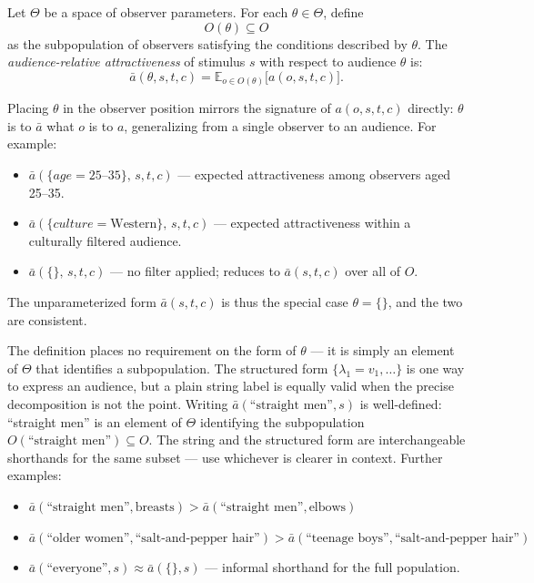 \begin{definition}
Let $\Theta$ be a space of observer parameters.
For each $\theta \in \Theta$, define
\[
  O(\theta) \subseteq O
\]
as the subpopulation of observers satisfying the conditions described by $\theta$.
The \emph{audience-relative attractiveness} of stimulus $s$ with respect to audience $\theta$ is:
\[
  \bar{a}(\theta, s, t, c) = \mathbb{E}_{o \in O(\theta)}\bigl[a(o, s, t, c)\bigr].
\]
\end{definition}

Placing $\theta$ in the observer position mirrors the signature of $a(o, s, t, c)$ directly: $\theta$ is to $\bar{a}$ what $o$ is to $a$, generalizing from a single observer to an audience.
For example:
\begin{itemize}
  \item $\bar{a}(\{\textit{age} = 25\text{--}35\},\, s, t, c)$ --- expected attractiveness among observers aged 25--35.
  \item $\bar{a}(\{\textit{culture} = \text{Western}\},\, s, t, c)$ --- expected attractiveness within a culturally filtered audience.
  \item $\bar{a}(\{\},\, s, t, c)$ --- no filter applied; reduces to $\bar{a}(s, t, c)$ over all of $O$.
\end{itemize}

The unparameterized form $\bar{a}(s, t, c)$ is thus the special case $\theta = \{\}$, and the two are consistent.

\begin{remark}
The definition places no requirement on the form of $\theta$ --- it is simply an element of $\Theta$ that identifies a subpopulation.
The structured form $\{\lambda_1 = v_1, \dots\}$ is one way to express an audience, but a plain string label is equally valid when the precise decomposition is not the point.
Writing $\bar{a}(\text{``straight men''}, s)$ is well-defined: ``straight men'' is an element of $\Theta$ identifying the subpopulation $O(\text{``straight men''}) \subseteq O$.
The string and the structured form are interchangeable shorthands for the same subset --- use whichever is clearer in context.
Further examples:
\begin{itemize}
  \item $\bar{a}(\text{``straight men''}, \text{breasts}) > \bar{a}(\text{``straight men''}, \text{elbows})$
  \item $\bar{a}(\text{``older women''}, \text{``salt-and-pepper hair''}) > \bar{a}(\text{``teenage boys''}, \text{``salt-and-pepper hair''})$
  \item $\bar{a}(\text{``everyone''}, s) \approx \bar{a}(\{\}, s)$ \quad --- informal shorthand for the full population.
\end{itemize}
\end{remark}

